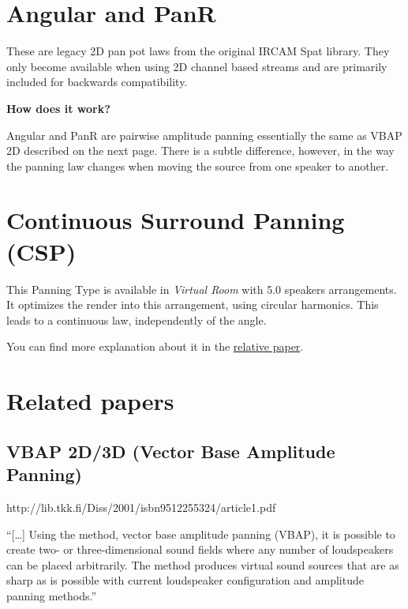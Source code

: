 \documentclass[
  letterpaper,
  DIV=11,
  numbers=noendperiod]{scrreport}
\begin{document}
\hypertarget{angular-and-panr}{%
\section{Angular and PanR}\label{angular-and-panr}}

These are legacy 2D pan pot laws from the original IRCAM Spat library.
They only become available when using 2D channel based streams and are
primarily included for backwards compatibility.

\textbf{How does it work?}

Angular and PanR are pairwise amplitude panning essentially the same as
VBAP 2D described on the next page. There is a subtle difference,
however, in the way the panning law changes when moving the source from
one speaker to another.

\hypertarget{continuous-surround-panning-csp}{%
\section{Continuous Surround Panning
(CSP)}\label{continuous-surround-panning-csp}}

This Panning Type is available in \emph{Virtual Room} with 5.0 speakers
arrangements. It optimizes the render into this arrangement, using
circular harmonics. This leads to a continuous law, independently of the
angle.

You can find more explanation about it in the
\href{http://www.music.mcgill.ca/marlonschumacher/wp-content/uploads/IMWI/literature/Spat1/Craven-Continuous_surround_panning_for_5-speaker_reproduction.pdf}{relative
paper}.

\hypertarget{related-papers}{%
\section{Related papers}\label{related-papers}}

\hypertarget{vbap-2d3d-vector-base-amplitude-panning}{%
\subsection{VBAP 2D/3D (Vector Base Amplitude
Panning)}\label{vbap-2d3d-vector-base-amplitude-panning}}

http://lib.tkk.fi/Diss/2001/isbn9512255324/article1.pdf

``{[}\ldots{]} Using the method, vector base amplitude panning (VBAP),
it is possible to create two- or three-dimensional sound fields where
any number of loudspeakers can be placed arbitrarily. The method
produces virtual sound sources that are as sharp as is possible with
current loudspeaker configuration and amplitude panning methods.''
\end{document}
